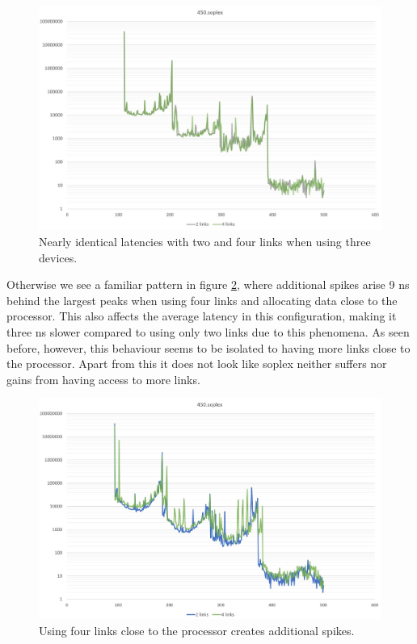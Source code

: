 \begin{figure}[!ht]
    \centering
    \includegraphics[width=1.0\linewidth]{figure/450-4_4-8.jpg}
    \caption{Nearly identical latencies with two and four links when using three devices.}
    \label{Memory-access-450-4-dev-4-8-links}
\end{figure}

Otherwise we see a familiar pattern in figure \ref{Memory-access-450-2-dev-4-8-links}, where additional spikes arise 9 ns behind the largest peaks when using four links and allocating data close to the processor. This also affects the average latency in this configuration, making it three ns slower compared to using only two links due to this phenomena. As seen before, however, this behaviour seems to be isolated to having more links close to the processor. Apart from this it does not look like soplex neither suffers nor gains from having access to more links. 

\begin{figure}[!ht]
    \centering
    \includegraphics[width=1.0\linewidth]{figure/450-2_4-8.jpg}
    \caption{Using four links close to the processor creates additional spikes.}
    \label{Memory-access-450-2-dev-4-8-links}
\end{figure}

